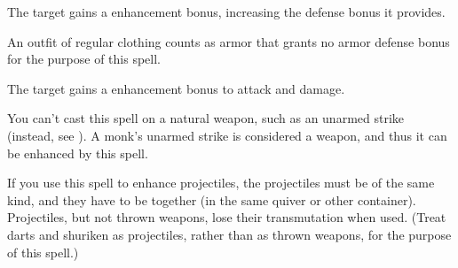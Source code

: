 \begin{spellfooter}
\begin{spellheader}
\end{spellheader}
\begin{spellcontent}
    \begin{spelltargetinginfo}
    \end{spelltargetinginfo}
    \begin{spelleffects}
        \spelleffect The target gains a  enhancement bonus, increasing the defense bonus it provides. \spellbonusscalingdescription
        \spelldur \durmed
    \end{spelleffects}
\end{spellcontent}
\begin{spellfooter}
    \spellnotes An outfit of regular clothing counts as armor that grants no armor defense bonus for the purpose of this spell.
\end{spellfooter}

\begin{spellheader}
\end{spellheader}
\begin{spellcontent}
    \begin{spelltargetinginfo}
    \end{spelltargetinginfo}
    \begin{spelleffects}
        \spelleffect The target gains a  enhancement bonus to attack and damage. \spellbonusscalingdescription
        \spelldur \durshort
    \end{spelleffects}
\end{spellcontent}
\begin{spellfooter}
    \spellnotes You can't cast this spell on a natural weapon, such as an unarmed strike (instead, see ). A monk's unarmed strike is considered a weapon, and thus it can be enhanced by this spell.
    \par If you use this spell to enhance projectiles, the projectiles must be of the same kind, and they have to be together (in the same quiver or other container). Projectiles, but not thrown weapons, lose their transmutation when used. (Treat darts and shuriken as projectiles, rather than as thrown weapons, for the purpose of this spell.)
\end{spellfooter}


\end{spellfooter}

